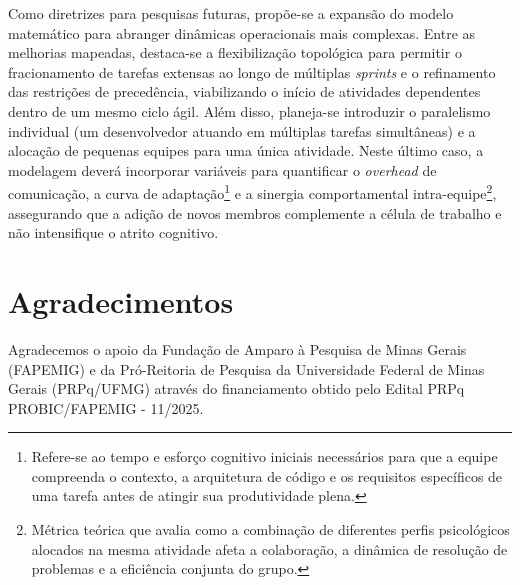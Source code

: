 \documentclass[a4paper,11pt]{article}
\begin{document}
Como diretrizes para pesquisas futuras, propõe-se a expansão do modelo matemático 
para abranger dinâmicas operacionais mais complexas. Entre as melhorias mapeadas, 
destaca-se a flexibilização topológica para permitir o fracionamento de tarefas 
extensas ao longo de múltiplas \textit{sprints} e o refinamento das restrições 
de precedência, viabilizando o início de atividades dependentes dentro de um 
mesmo ciclo ágil. Além disso, planeja-se introduzir o paralelismo individual 
(um desenvolvedor atuando em múltiplas tarefas simultâneas) e a alocação de 
pequenas equipes para uma única atividade. Neste último caso, a modelagem deverá 
incorporar variáveis para quantificar o \textit{overhead} de comunicação, a 
curva de adaptação\footnote{Refere-se ao tempo e esforço cognitivo iniciais
necessários para que a equipe compreenda o contexto, a arquitetura de código e os
requisitos específicos de uma tarefa antes de atingir sua produtividade plena.} e
a sinergia comportamental intra-equipe\footnote{Métrica teórica que avalia como a
combinação de diferentes perfis psicológicos alocados na mesma atividade afeta a
colaboração, a dinâmica de resolução de problemas e a eficiência conjunta do grupo.},
assegurando que a adição de novos membros complemente a célula de trabalho e não
intensifique o atrito cognitivo.

\section*{Agradecimentos}

Agradecemos o apoio da Fundação de Amparo à Pesquisa de Minas Gerais (FAPEMIG) e da
Pró-Reitoria de Pesquisa da Universidade Federal de Minas Gerais (PRPq/UFMG) através
do financiamento obtido pelo Edital PRPq PROBIC/FAPEMIG - 11/2025.



\end{document}
